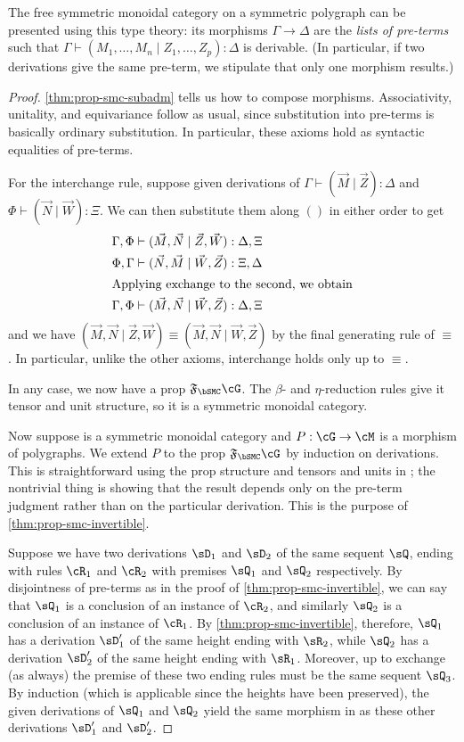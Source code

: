 \documentclass{book}
\let\types\vdash
\newcommand{\F}[1]{\mathfrak{F}_{#1}}
\begin{document}
\begin{thm}\label{thm:prop-smc-initial}
  The free symmetric monoidal category on a symmetric polygraph can be presented using this type theory: its morphisms $\Gamma\to\Delta$ are the \emph{lists of pre-terms} such that $\Gamma\types (M_1,\dots,M_n \mid Z_1,\dots,Z_p):\Delta$ is derivable.
  (In particular, if two derivations give the same pre-term, we stipulate that only one morphism results.)
\end{thm}
\begin{proof}
  \cref{thm:prop-smc-subadm} tells us how to compose morphisms.
  Associativity, unitality, and equivariance follow as usual, since substitution into pre-terms is basically ordinary substitution.
  In particular, these axioms hold as syntactic equalities of pre-terms.

  For the interchange rule, suppose given derivations of $\Gamma\types (\vec M\mid\vec Z):\Delta$ and $\Phi\types (\vec N\mid\vec W):\Xi$.
  We can then substitute them along $()$ in either order to get
  \begin{align*}
    \Gamma,\Phi &\types (\vec M,\vec N\mid \vec Z,\vec W):\Delta,\Xi\\
    \Phi,\Gamma &\types (\vec N,\vec M\mid \vec W,\vec Z):\Xi,\Delta\\
\intertext{Applying exchange to the second, we obtain}
    \Gamma,\Phi &\types (\vec M,\vec N\mid \vec W,\vec Z):\Delta,\Xi
  \end{align*}
  and we have $(\vec M,\vec N\mid \vec Z,\vec W) \equiv (\vec M,\vec N\mid \vec W,\vec Z)$ by the final generating rule of $\equiv$.
  In particular, unlike the other axioms, interchange holds only up to $\equiv$.

  In any case, we now have a prop $\F\bSMC\cG$.
  The $\beta$- and $\eta$-reduction rules give it tensor and unit structure, so it is a symmetric monoidal category.

  Now suppose \cM is a symmetric monoidal category and $P:\cG\to\cM$ is a morphism of polygraphs.
  We extend $P$ to the prop $\F\bSMC\cG$ by induction on derivations.
  This is straightforward using the prop structure and tensors and units in \cM; the nontrivial thing is showing that the result depends only on the pre-term judgment rather than on the particular derivation.
  This is the purpose of \cref{thm:prop-smc-invertible}.

  Suppose we have two derivations $\sD_1$ and $\sD_2$ of the same sequent $\sQ$, ending with rules $\cR_1$ and $\cR_2$ with premises $\sQ_1$ and $\sQ_2$ respectively.
  By disjointness of pre-terms as in the proof of \cref{thm:prop-smc-invertible}, we can say that $\sQ_1$ is a conclusion of an instance of $\cR_2$, and similarly $\sQ_2$ is a conclusion of an instance of $\cR_1$.
  By \cref{thm:prop-smc-invertible}, therefore, $\sQ_1$ has a derivation $\sD_1'$ of the same height ending with $\sR_2$, while $\sQ_2$ has a derivation $\sD_2'$ of the same height ending with $\sR_1$.
  Moreover, up to exchange (as always) the premise of these two ending rules must be the same sequent $\sQ_3$.
  By induction (which is applicable since the heights have been preserved), the given derivations of $\sQ_1$ and $\sQ_2$ yield the same morphism in \cM as these other derivations $\sD_1'$ and $\sD_2'$.


\end{proof}
\end{document}
